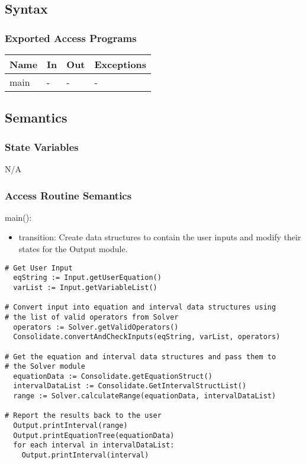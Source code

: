 \documentclass[12pt, titlepage]{article}
\begin{document}
\subsection{Syntax}

\subsubsection{Exported Access Programs}

\begin{center}
\begin{tabular}{p{3cm} p{3cm} p{3cm} p{5cm}}
\hline
\textbf{Name} & \textbf{In} & \textbf{Out} & \textbf{Exceptions} \\
\hline
main & - & - & - \\
\hline
\end{tabular}
\end{center}

\subsection{Semantics}

\subsubsection{State Variables}

N/A

\subsubsection{Access Routine Semantics}

\noindent main():
\begin{itemize}
\item transition: Create data structures to contain the user inputs and modify 
their states for the Output module.
\end{itemize}

\begin{lstlisting}
# Get User Input
  eqString := Input.getUserEquation()
  varList := Input.getVariableList()
 
# Convert input into equation and interval data structures using 
# the list of valid operators from Solver
  operators := Solver.getValidOperators()
  Consolidate.convertAndCheckInputs(eqString, varList, operators)
  
# Get the equation and interval data structures and pass them to 
# the Solver module
  equationData := Consolidate.getEquationStruct()
  intervalDataList := Consolidate.GetIntervalStructList()
  range := Solver.calculateRange(equationData, intervalDataList)
  
# Report the results back to the user
  Output.printInterval(range)
  Output.printEquationTree(equationData)
  for each interval in intervalDataList:
    Output.printInterval(interval)
\end{lstlisting}
\end{document}
